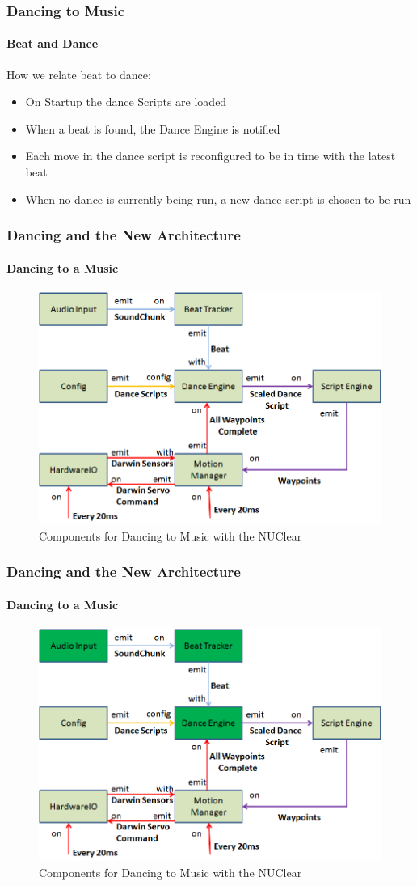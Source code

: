 \documentclass{beamer}
\begin{document}
	\begin{frame}
		\frametitle{Dancing to Music}
		\framesubtitle{Beat and Dance}
		How we relate beat to dance:
		\begin{itemize}
			\item On Startup the dance Scripts are loaded
			\item When a beat is found, the Dance Engine is notified
			\item Each move in the dance script is reconfigured to be in time with the latest beat
			\item When no dance is currently being run, a new dance script is chosen to be run
		\end{itemize}
	\end{frame}	
	\begin{frame}
		\frametitle{Dancing and the New Architecture}
		\framesubtitle{Dancing to a Music}
		\begin{figure}
			\centering
			\includegraphics[scale=.45]{Presentation_Images/dance_audio_new_arc.png}
			\caption{Components for Dancing to Music with the NUClear}
		\end{figure}
	\end{frame}	
	\begin{frame}
		\frametitle{Dancing and the New Architecture}
		\framesubtitle{Dancing to a Music}
		\begin{figure}
			\centering
			\includegraphics[scale=.45]{Presentation_Images/dance_audio_new_arc_change.png}
			\caption{Components for Dancing to Music with the NUClear}
		\end{figure}
	\end{frame}	
\end{document}
